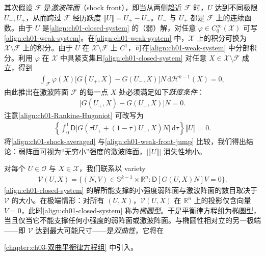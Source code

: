 \documentclass[../../main.tex]{subfiles}
\begin{document}
其次假设 $\mathscr{F}$ 是\emph{激波阵面}（shock front），即当从两侧趋近 $\mathscr{F}$ 时，$U$ 达到不同极限 $U_{-},U_{+}$，从而跨过 $\mathscr{F}$ 经历跃度 $\llbracket U\rrbracket=U_{+}-U_{-}$。$U_{-}$ 与 $U_{+}$ 都是 $\mathscr{F}$ 上的连续函数。由于 $U$ 是\cref{align:ch01-closed-system} 的（弱）解，对任意 $\varphi\in C_{0}^{\infty}(\mathscr{X})$ 可写\cref{align:ch01-weak-system}。在\cref{align:ch01-weak-system} 中，$\mathscr{X}$ 上的积分可换为 $\mathscr{X}\setminus\mathscr{F}$ 上的积分。由于 $U$ 在 $\mathscr{X}\setminus\mathscr{F}$ 上 $C^{1}$，可在\cref{align:ch01-weak-system} 中分部积分。利用 $\varphi$ 在 $\mathscr{X}$ 中具紧支集且\cref{align:ch01-closed-system} 对任意 $X\in\mathscr{X}\setminus\mathscr{F}$ 成立，得到
\begin{align}
\int_{\mathscr{F}}\varphi(X)\bigl[G(U_{+},X)-G(U_{-},X)\bigr]N\,\mathrm{d}\mathscr{H}^{k-1}(X)=0,\label{align:ch01-shock-integral}
\end{align}
由此推出在激波阵面 $\mathscr{F}$ 的每一点 $X$ 处必须满足如下\emph{跃度条件}：
\begin{align}
\bigl[G(U_{+},X)-G(U_{-},X)\bigr]N=0.\label{align:ch01-Rankine-Hugoniot}
\end{align}
注意\cref{align:ch01-Rankine-Hugoniot} 可改写为
\begin{align}
\left\{\int_{0}^{1}\mathsf{D}\bigl[G(\tau U_{+}+(1-\tau)U_{-},X)N\bigr]\,\mathrm{d}\tau\right\}\llbracket U\rrbracket=0.\label{align:ch01-shock-averaged}
\end{align}
将\cref{align:ch01-shock-averaged} 与\cref{align:ch01-weak-front-jump} 比较，我们得出结论：弱阵面可视为“无穷小”强度的激波阵面，$|\llbracket U\rrbracket|$ 消失性地小。

对每个 $U\in\mathcal{O}$ 与 $X\in\mathscr{X}$，我们联系以 variety
\begin{align}
\mathscr{V}(U,X)=\{(N,V)\in\mathbb{S}^{k-1}\times\mathbb{R}^{n}:\mathsf{D}[G(U,X)N]V=0\}.\label{align:ch01-variety}
\end{align}
\cref{align:ch01-closed-system} 的解所能支撑的小强度弱阵面与激波阵面的数目取决于 $\mathscr{V}$ 的大小。在极端情形：对所有 $(U,X)$，$\mathscr{V}(U,X)$ 在 $\mathbb{R}^{n}$ 上的投影仅含向量 $V=0$，此时\cref{align:ch01-closed-system} 称为\emph{椭圆型}。于是平衡律方程组为椭圆型，当且仅当它不能支撑任何小强度的弱阵面或激波阵面。与椭圆性相对立的另一极端——即 $\mathscr{V}$ 达到最大可能尺寸——是\emph{双曲性}，它将在%

\cref{chapter:ch03-双曲平衡律方程组} 中引入。
\end{document}
